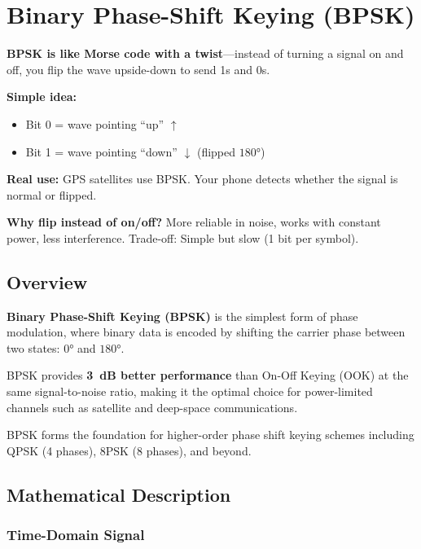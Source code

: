 \chapter{Binary Phase-Shift Keying (BPSK)}
\label{ch:bpsk}

\begin{nontechnical}
\textbf{BPSK is like Morse code with a twist}---instead of turning a signal on and off, you flip the wave upside-down to send 1s and 0s.

\textbf{Simple idea:}
\begin{itemize}
\item Bit 0 = wave pointing ``up'' $\uparrow$
\item Bit 1 = wave pointing ``down'' $\downarrow$ (flipped $180°$)
\end{itemize}

\textbf{Real use:} GPS satellites use BPSK. Your phone detects whether the signal is normal or flipped.

\textbf{Why flip instead of on/off?} More reliable in noise, works with constant power, less interference. Trade-off: Simple but slow (1 bit per symbol).
\end{nontechnical}

\section{Overview}

\textbf{Binary Phase-Shift Keying (BPSK)} is the simplest form of phase modulation, where binary data is encoded by shifting the carrier phase between two states: $0°$ and $180°$.

\begin{keyconcept}
BPSK provides \textbf{3~dB better performance} than On-Off Keying (OOK) at the same signal-to-noise ratio, making it the optimal choice for power-limited channels such as satellite and deep-space communications.
\end{keyconcept}

BPSK forms the foundation for higher-order phase shift keying schemes including QPSK (4 phases), 8PSK (8 phases), and beyond.

\section{Mathematical Description}

\subsection{Time-Domain Signal}

